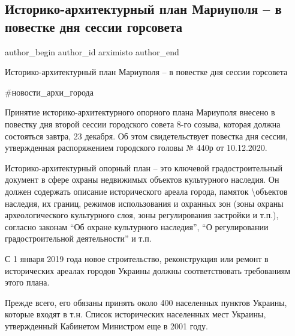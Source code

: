  
 
 
 
 

\subsection{Историко-архитектурный план Мариуполя – в повестке дня сессии горсовета}
\label{sec:22_12_2020.fb.arximisto.1.istoriko_arhitekturnyj_plan_povestka}

\ifcmt
 author_begin
   author_id arximisto
 author_end
\fi

Историко-архитектурный план Мариуполя – в повестке дня сессии горсовета

\#новости\_архи\_города

Принятие историко-архитектурного опорного плана Мариуполя внесено в повестку
дня второй сессии городского совета 8-го созыва, которая должна состояться
завтра, 23 декабря. Об этом свидетельствует повестка дня сессии, утвержденная
распоряжением городского головы № 440р от 10.12.2020.


Историко-архитектурный опорный план – это ключевой градостроительный документ в
сфере охраны недвижимых объектов культурного наследия. Он должен содержать
описание исторического ареала города, памяток \textbackslash объектов наследия, их границ,
режимов использования и охранных зон (зоны охраны археологического культурного
слоя, зоны регулирования застройки и т.п.), согласно законам \enquote{Об охране
культурного наследия}, \enquote{О регулировании градостроительной деятельности} и т.п.

С 1 января 2019 года новое строительство, реконструкция или ремонт в
исторических ареалах городов Украины должны соответствовать требованиям этого
плана.

Прежде всего, его обязаны принять около 400 населенных пунктов Украины, которые
входят в т.н. Список исторических населенных мест Украины, утвержденный
Кабинетом Министром еще в 2001 году.

